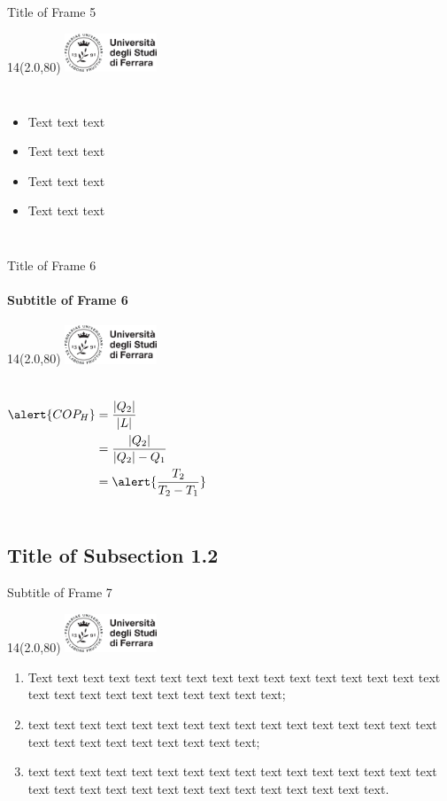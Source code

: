 \documentclass[11pt,xcolor={dvipsnames},default]{beamer} %
\DeclarePairedDelimiter{\abs}{\lvert}{\rvert}
\newcommand{\MyLogo}{%
\begin{textblock}{14}(2.0,80)
 \includegraphics[height=1.15cm, angle=0]{logo}
\end{textblock}
}
\begin{document}
\begin{frame}{Title of Frame 5}
\MyLogo
\begin{columns}
	\begin{itemize}
  		\item Text text text
  		\item Text text text
		\item Text text text
		\item Text text text
  	\end{itemize}
\end{columns}
\end{frame}

\begin{frame}{Title of Frame 6}
\framesubtitle{Subtitle of Frame 6}
\MyLogo
\begin{columns}
\begin{align*}
 \alert{COP_H} &= \dfrac{\abs{Q_2}}{\abs{L}} \\
 	   &= \dfrac{\abs{Q_2}}{\abs{Q_2}-Q_1} \\
 	   &= \alert{\dfrac{T_2}{T_2-T_1}} \\
\end{align*}
\end{columns}
\end{frame}

\subsection{Title of Subsection 1.2}
\begin{frame}{Subtitle of Frame 7}
\MyLogo
\begin{enumerate}
\item<1-> Text text text text text text text text text text text text text text text text text text text text text text text text text text;
\item<2-> text text text text text text text text text text text text text text text text text text text text text text text text text;
\item<3-> text text text text text text text text text text text text text text text text text text text text text text text text text text text text text text.
\end{enumerate}
\end{frame}
\end{document}
